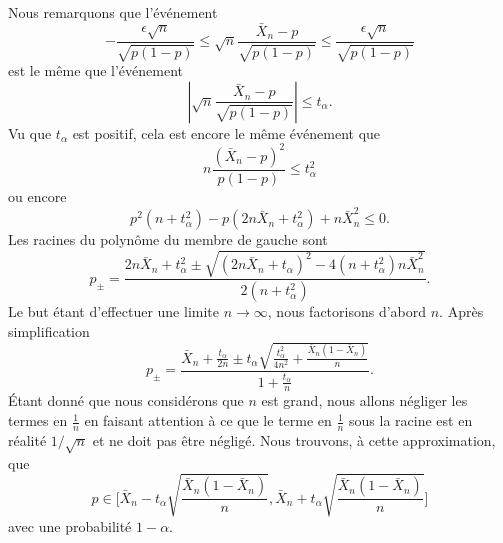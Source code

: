 \begin{description}
	      Nous remarquons que l'événement
	      \begin{equation}
		      -\frac{ \epsilon\sqrt{n} }{ \sqrt{p(1-p)} }\leq \sqrt{n}\frac{ \bar X_n-p }{ \sqrt{p(1-p)} }\leq \frac{ \epsilon\sqrt{n} }{ \sqrt{p(1-p)} }
	      \end{equation}
	      est le même que l'événement
	      \begin{equation}
		      \left| \sqrt{n}\frac{ \bar X_n-p }{ \sqrt{p(1-p)} } \right| \leq t_{\alpha}.
	      \end{equation}
	      Vu que \( t_{\alpha}\) est positif, cela est encore le même événement que
	      \begin{equation}
		      n\frac{ (\bar X_n-p)^2 }{ p(1-p) }\leq t_{\alpha}^2
	      \end{equation}
	      ou encore
	      \begin{equation}
		      p^2(n+t_{\alpha}^2)-p(2n\bar X_n+t_{\alpha}^2)+n\bar X_n^2\leq 0.
	      \end{equation}
	      Les racines du polynôme du membre de gauche sont
	      \begin{equation}
		      p_{\pm}=\frac{ 2n\bar X_n+t_{\alpha}^2\pm\sqrt{ (2n\bar X_n+t_{\alpha})^2-4(n+t_{\alpha}^2)n\bar X_n^2  } }{ 2(n+t_{\alpha}^2) }.
	      \end{equation}
	      Le but étant d'effectuer une limite \( n\to\infty\), nous factorisons d'abord \( n\). Après simplification
	      \begin{equation}
		      p_{\pm}=\frac{ \bar X_n+\frac{ t_{\alpha} }{ 2n }\pm t_{\alpha}\sqrt{\frac{ t_{\alpha}^2 }{ 4n^2 }+\frac{ \bar X_n(1-\bar X_n) }{ n }} }{ 1+\frac{ t_{\alpha} }{ n } }.
	      \end{equation}
	      Étant donné que nous considérons que \( n\) est grand, nous allons négliger les termes en \( \frac{1}{ n }\) en faisant attention à ce que le terme en $\frac{1}{ n }$ sous la racine est en réalité \( 1/\sqrt{n}\) et ne doit pas être négligé. Nous trouvons, à cette approximation, que
	      \begin{equation}
		      p\in\mathopen\Big[  \bar X_n-t_{\alpha}\sqrt{\frac{ \bar X_n(1-\bar X_n) }{ n }}  , \bar X_n+t_{\alpha}\sqrt{\frac{ \bar X_n(1-\bar X_n) }{ n }} \mathclose\Big]
	      \end{equation}
	      avec une probabilité \( 1-\alpha\).

\end{description}

